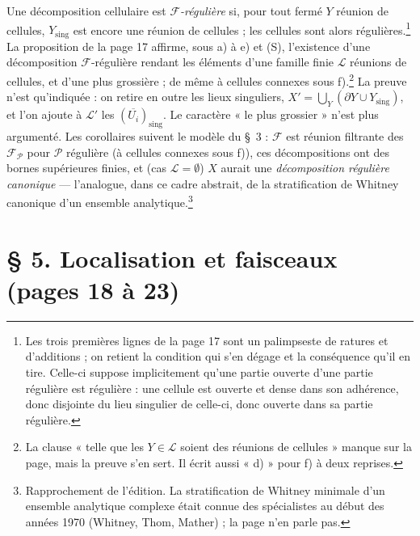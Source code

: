 \documentclass[11pt,a4paper]{article}
\begin{document}
Une décomposition cellulaire est \emph{$\mathcal{F}$-régulière} si, pour tout
fermé $Y$ réunion de cellules, $Y_{\mathrm{sing}}$ est encore une réunion de
cellules ; les cellules sont alors régulières.\footnote{Les trois premières
lignes de la page 17 sont un palimpseste de ratures et d'additions ; on retient
la condition qui s'en dégage et la conséquence qu'il en tire. Celle-ci suppose
implicitement qu'une partie ouverte d'une partie régulière est régulière : une
cellule est ouverte et dense dans son adhérence, donc disjointe du lieu
singulier de celle-ci, donc ouverte dans sa partie régulière.} La proposition
de la page 17 affirme, sous a) à e) et (S), l'existence d'une décomposition
$\mathcal{F}$-régulière rendant les éléments d'une famille finie $\mathcal{L}$
réunions de cellules, et d'une plus grossière ; de même à cellules connexes
sous f).\footnote{La clause « telle que les $Y \in \mathcal{L}$ soient des
réunions de cellules » manque sur la page, mais la preuve s'en sert. Il écrit
aussi « d) » pour f) à deux reprises.} La preuve n'est qu'indiquée : on retire
en outre les lieux singuliers, $X' = \bigcup_{Y} (\partial Y \cup
Y_{\mathrm{sing}})$, et l'on ajoute à $\mathcal{L}'$ les
$(\overline{U_i})_{\mathrm{sing}}$. Le caractère « le plus grossier » n'est
plus argumenté. Les corollaires suivent le modèle du §~3 : $\mathcal{F}$ est
réunion filtrante des $\mathcal{F}_{\mathcal{P}}$ pour $\mathcal{P}$ régulière
(à cellules connexes sous f)), ces décompositions ont des bornes supérieures
finies, et (cas $\mathcal{L} = \emptyset$) $X$ aurait une
\emph{décomposition régulière canonique} — l'analogue, dans ce cadre abstrait,
de la stratification de Whitney canonique d'un ensemble
analytique.\footnote{Rapprochement de l'édition. La stratification de Whitney
minimale d'un ensemble analytique complexe était connue des spécialistes au
début des années 1970 (Whitney, Thom, Mather) ; la page n'en parle pas.}

\section*{§ 5. Localisation et faisceaux (pages 18 à 23)}
\end{document}
